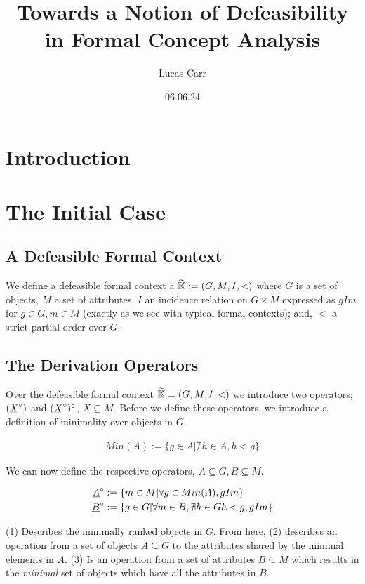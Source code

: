 \documentclass[11pt]{article}
\title{Towards a Notion of Defeasibility in Formal Concept Analysis}
\author{Lucas Carr}
\date{06.06.24}
\begin{document}
\maketitle

\section{Introduction}
\section{The Initial Case}
\subsection{A Defeasible Formal Context} 
We define a defeasible formal context a $\widetilde{\mathbb{K}} := (G,M,I,<)$ where $G$ is a set of objects, $M$ a set of attributes, $I$ an incidence relation on $G \times M$ expressed as $gIm$ for $g\in G, m\in M$ (exactly as we see with typical formal contexts); and, $<$ a strict partial order over $G$. 

\subsection{The Derivation Operators}
Over the defeasible formal context $\widetilde{\mathbb{K}} = (G,M,I,<)$ we introduce two operators; $(\underline{X}^\circ)$ and $(\underline{X}^\circ)^\circ$, $X\subseteq M$. Before we define these operators, we introduce a definition of minimality over objects in $G$. 

\begin{align}
  Min(A) := \{g \in A | \nexists h \in A, h < g\} 
\end{align}

We can now define the respective operators, $A \subseteq G, B\subseteq M$. 

\begin{align}
  \underline{A}^\circ &:= \{m \in M | \forall g \in Min(A), gIm\} \\ 
  \underline{B}^\circ &:= \{g \in G | \forall m \in B, \nexists h \in G h < g, gIm  \}
\end{align}

(1) Describes the minimally ranked objects in $G$. From here, (2) describes an operation from a set of objects $A \subseteq G$ to the attributes shared by the minimal elements in $A$. (3) Is an operation from a set of attributes $B\subseteq M$ which results in the \textit{minimal} set of objects which have all the attributes in $B$. 
\end{document}
